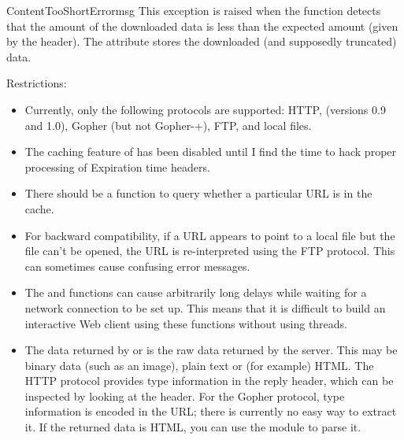 \begin{excclassdesc}{ContentTooShortError}{msg}
This exception is raised when the  function
detects that the amount of the downloaded data is less than the 
expected amount (given by the  header). The
 attribute stores the downloaded (and supposedly
truncated) data.
\end{excclassdesc}

Restrictions:

\begin{itemize}

\item
Currently, only the following protocols are supported: HTTP, (versions
0.9 and 1.0), Gopher (but not Gopher-+), FTP, and local files.

\item
The caching feature of  has been disabled
until I find the time to hack proper processing of Expiration time
headers.

\item
There should be a function to query whether a particular URL is in
the cache.

\item
For backward compatibility, if a URL appears to point to a local file
but the file can't be opened, the URL is re-interpreted using the FTP
protocol.  This can sometimes cause confusing error messages.

\item
The  and  functions can
cause arbitrarily long delays while waiting for a network connection
to be set up.  This means that it is difficult to build an interactive
Web client using these functions without using threads.

\item
The data returned by  or 
is the raw data returned by the server.  This may be binary data
(such as an image), plain text or (for example) HTML.  The
HTTP protocol provides type information in the
reply header, which can be inspected by looking at the
 header.  For the
Gopher protocol, type information is encoded
in the URL; there is currently no easy way to extract it.  If the
returned data is HTML, you can use the module
 to parse it.


\end{itemize}
